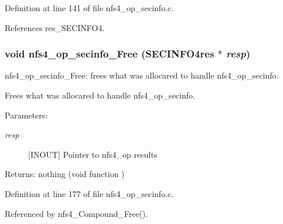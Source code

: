 Definition at line 141 of file nfs4\_\-op\_\-secinfo.c.

References res\_\-SECINFO4.
\subsubsection{\setlength{\rightskip}{0pt plus 5cm}void nfs4\_\-op\_\-secinfo\_\-Free (SECINFO4res $\ast$ {\em resp})}\label{nfs4__op__secinfo_8c_a3}


nfs4\_\-op\_\-secinfo\_\-Free: frees what was allocared to handle nfs4\_\-op\_\-secinfo.

Frees what was allocared to handle nfs4\_\-op\_\-secinfo.

\begin{Desc}
\item[Parameters:]
\begin{description}
\item[{\em resp}][INOUT] Pointer to nfs4\_\-op results\end{description}
\end{Desc}
\begin{Desc}
\item[Returns:]nothing (void function ) \end{Desc}


Definition at line 177 of file nfs4\_\-op\_\-secinfo.c.

Referenced by nfs4\_\-Compound\_\-Free().